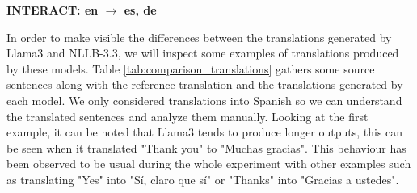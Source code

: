 \documentclass[11pt,english,listoffigures,listoftables]{tfgetsinf}
\begin{document}
\begin{table}[h]
    \centering
    \caption{Results for best adapted models of each type of architecture on INTERACT test set.}
    \label{tab:comparison_scores}
    \textbf{INTERACT: en $\rightarrow$ es, de \\}
\end{table}

In order to make visible the differences between the translations generated by Llama3 and NLLB-3.3, we will inspect some examples of translations produced by these models. Table \ref{tab:comparison_translations} gathers some source sentences along with the reference translation and the translations generated by each model. We only considered translations into Spanish so we can understand the translated sentences and analyze them manually. Looking at the first example, it can be noted that Llama3 tends to produce longer outputs, this can be seen when it translated "Thank you" to "Muchas gracias". This behaviour has been observed to be usual during the whole experiment with other examples such as translating "Yes" into "Sí, claro que sí" or "Thanks" into "Gracias a ustedes". 
\end{document}
